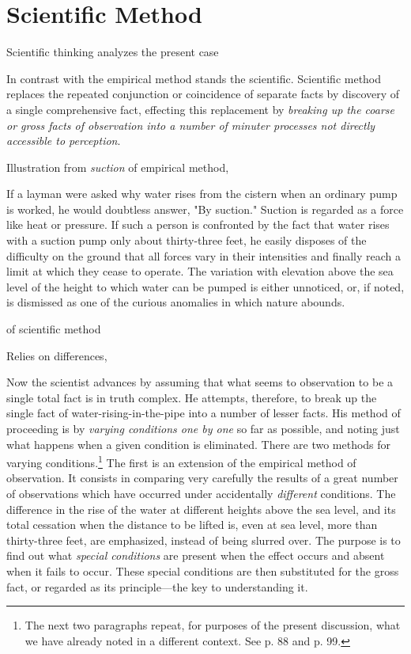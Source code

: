 \documentclass[letterpaper]{book}
\begin{document}
\section{Scientific Method}

Scientific thinking analyzes the present case

In contrast with the empirical method stands the scientific. Scientific
method replaces the repeated conjunction or coincidence of separate
facts by discovery of a single comprehensive fact, effecting this
replacement by \emph{breaking up the coarse or gross facts of
observation into a number of minuter processes not directly accessible
to perception}.

Illustration from \emph{suction} of empirical method,

If a layman were asked why water rises from the cistern when an ordinary
pump is worked, he would doubtless answer, "By suction." Suction is
regarded as a force like heat or pressure. If such a person is
confronted by the fact that water rises with a suction pump only about
thirty-three feet, he easily disposes of the difficulty on the ground
that all forces vary in their intensities and finally reach a limit at
which they cease to operate. The variation with elevation above the sea
level of the height to which water can be pumped is either unnoticed,
or, if noted, is dismissed as one of the curious anomalies in which
nature abounds.

of scientific method

Relies on differences,

Now the scientist advances by assuming that what seems to observation to
be a single total fact is in truth complex. He attempts, therefore, to
break up the single fact of water-rising-in-the-pipe into a number of
lesser facts. His method of proceeding is by \emph{varying conditions
one by one} so far as possible, and noting just what happens when a
given condition is eliminated. There are two methods for varying
conditions.\footnote{
The next two paragraphs repeat, for purposes of the present discussion,
what we have already noted in a different context. See p. 88 and p. 99.
}
The first is an extension of the empirical method of observation. It
consists in comparing very carefully the results of a great number of
observations which have
occurred
under accidentally \emph{different} conditions. The difference in the
rise of the water at different heights above the sea level, and its
total cessation when the distance to be lifted is, even at sea level,
more than thirty-three feet, are emphasized, instead of being slurred
over. The purpose is to find out what \emph{special conditions} are
present when the effect occurs and absent when it fails to occur. These
special conditions are then substituted for the gross fact, or regarded
as its principle---the key to understanding it.
\end{document}
